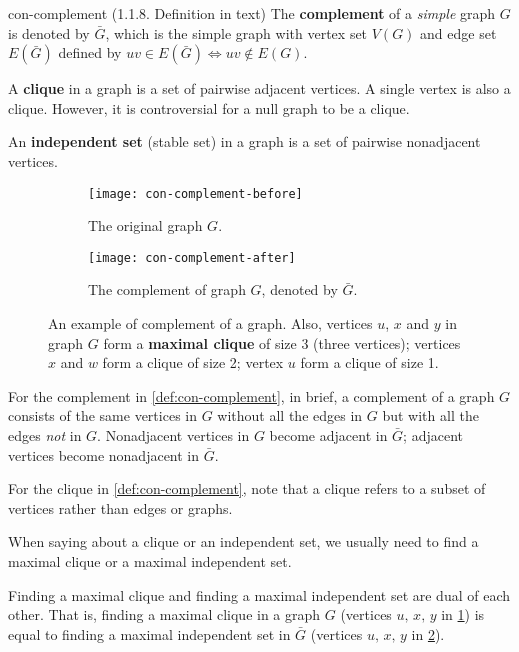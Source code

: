 \documentclass[../src/handouts/main.tex]{subfiles}
\begin{document}
\begin{definition}{}{con-complement}
  (1.1.8. Definition in text)
  The \textbf{complement} of a \textit{simple} graph $G$ is denoted by $\bar G$, which is the simple graph with vertex set $V(G)$ and edge set $E(\bar G)$ defined by $uv \in E(\bar G) \iff uv \notin E(G)$.

  A \textbf{clique} in a graph is a set of pairwise adjacent vertices. A single vertex is also a clique. However, it is controversial for a null graph to be a clique.

  An \textbf{independent set} (stable set) in a graph is a set of pairwise nonadjacent vertices.
\end{definition}

\begin{figure}[htbp]
  \centering
  \begin{subfigure}[t]{.3\textwidth}
    \centering
    \texttt{[image: con-complement-before]}
    \caption{The original graph $G$.}
    \label{fig:con-complement-before}
  \end{subfigure}
  \hspace{.1\textwidth}
  \begin{subfigure}[t]{.3\textwidth}
    \centering
    \texttt{[image: con-complement-after]}
    \caption{The complement of graph $G$, denoted by $\bar G$.}
    \label{fig:con-complement-after}
  \end{subfigure}
  \caption{An example of complement of a graph. Also, vertices $u$, $x$ and $y$ in graph $G$ form a \textbf{maximal clique} of size 3 (three vertices); vertices $x$ and $w$ form a clique of size 2; vertex $u$ form a clique of size 1.}
  \label{fig:con-complement}
\end{figure}

For the complement in \cref{def:con-complement}, in brief, a complement of a graph $G$ consists of the same vertices in $G$ without all the edges in $G$ but with all the edges \textit{not} in $G$. Nonadjacent vertices in $G$ become adjacent in $\bar{G}$; adjacent vertices become nonadjacent in $\bar{G}$.

For the clique in \cref{def:con-complement}, note that a clique refers to a subset of vertices rather than edges or graphs.

When saying about a clique or an independent set, we usually need to find a maximal clique or a maximal independent set.

Finding a maximal clique and finding a maximal independent set are dual of each other. That is, finding a maximal clique in a graph $G$ (vertices $u,\, x,\, y$ in \cref{fig:con-complement-before}) is equal to finding a maximal independent set in $\bar G$ (vertices $u,\, x,\, y$ in \cref{fig:con-complement-after}). 
\end{document}
